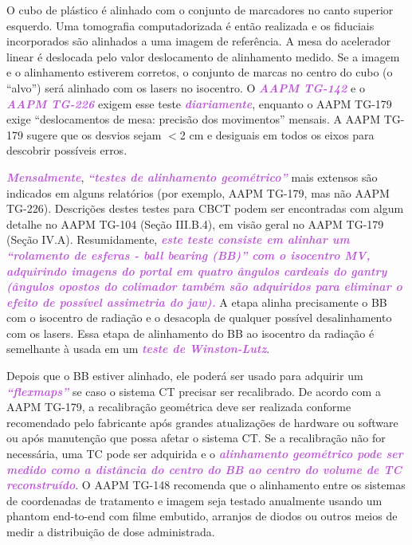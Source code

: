 \documentclass[11pt,a4paper]{article}
\newcounter{exemplo}
\begin{document}
    O cubo de plástico é alinhado com o conjunto de marcadores no canto superior esquerdo. Uma tomografia computadorizada é então realizada e os fiduciais incorporados são alinhados a uma imagem de referência. A mesa do acelerador linear é deslocada pelo valor deslocamento de alinhamento medido. Se a imagem e o alinhamento estiverem corretos, o conjunto de marcas no centro do cubo (o “alvo”) será alinhado com os lasers no isocentro. O \textcolor{MediumOrchid}{\textbf{\textit{AAPM TG-142}}} e o \textcolor{MediumOrchid}{\textbf{\textit{AAPM TG-226}}} exigem esse teste \textcolor{MediumOrchid}{\textbf{\textit{diariamente}}}, enquanto o AAPM TG-179 exige “deslocamentos de mesa: precisão dos movimentos” mensais. A AAPM TG-179 sugere que os desvios sejam $<$2 cm e desiguais em todos os eixos para descobrir possíveis erros.

    \textcolor{MediumOrchid}{\textbf{\textit{Mensalmente}}}, \textcolor{MediumOrchid}{\textbf{\textit{“testes de alinhamento geométrico”}}} mais extensos são indicados em alguns relatórios (por exemplo, AAPM TG-179, mas não AAPM TG-226). Descrições destes testes para CBCT podem ser encontradas com algum detalhe no AAPM TG-104 (Seção III.B.4), em visão geral no AAPM TG-179 (Seção IV.A). Resumidamente, \textcolor{MediumOrchid}{\textbf{\textit{este teste consiste em alinhar um “rolamento de esferas - ball bearing (BB)” com o isocentro MV, adquirindo imagens do portal em quatro ângulos cardeais do gantry (ângulos opostos do colimador também são adquiridos para eliminar o efeito de possível assimetria do jaw).}}} A etapa alinha precisamente o BB com o isocentro de radiação e o desacopla de qualquer possível desalinhamento com os lasers. Essa etapa de alinhamento do BB ao isocentro da radiação é semelhante à usada em um \textcolor{MediumOrchid}{\textbf{\textit{teste de Winston-Lutz}}}.

    Depois que o BB estiver alinhado, ele poderá ser usado para adquirir um \textcolor{MediumOrchid}{\textbf{\textit{“flexmaps”}}} se caso o sistema CT precisar ser recalibrado. De acordo com a AAPM TG-179, a recalibração geométrica deve ser realizada conforme recomendado pelo fabricante após grandes atualizações de hardware ou software ou após manutenção que possa afetar o sistema CT. Se a recalibração não for necessária, uma TC pode ser adquirida e o \textcolor{MediumOrchid}{\textbf{\textit{alinhamento geométrico pode ser medido como a distância do centro do BB ao centro do volume de TC reconstruído}}}. O AAPM TG-148 recomenda que o alinhamento entre os sistemas de coordenadas de tratamento e imagem seja testado anualmente usando um phantom end-to-end com filme embutido, arranjos de diodos ou outros meios de medir a distribuição de dose administrada.
\end{document}
